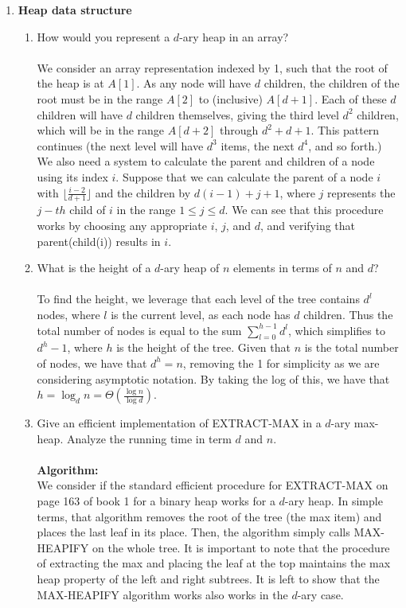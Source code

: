 \documentclass{article}
\begin{document}
\begin{enumerate}
\item \textbf{Heap data structure}
	\begin{enumerate}
		\item How would you represent a $d$-ary heap in an array?
\\\\ We consider an array representation indexed by 1, such that the root of the heap is at $A[1]$. As any node will have $d$ children, the children of the root must be in the range $A[2]$ to (inclusive) $A[d+1]$. Each of these $d$ children will have $d$ children themselves, giving the third level $d^2$ children, which will be in the range $A[d+2]$ through $d^2+d+1$. This pattern continues (the next level will have $d^3$ items, the next $d^4$, and so forth.)
\\ We also need a system to calculate the parent and children of a node using its index $i$. Suppose that we can calculate the parent of a node $i$ with $\lfloor  \frac{i-2}{d+1} \rfloor$ and the children by $d(i-1)+j+1$, where $j$ represents the $j-th$ child of $i$ in the range $1\leq j \leq d$. We can see that this procedure works by choosing any appropriate $i$, $j$, and $d$, and verifying that parent(child(i)) results in $i$.
		\item What is the height of a $d$-ary heap of $n$ elements in terms of $n$ and $d$?
\\\\ To find the height, we leverage that each level of the tree contains $d^l$ nodes, where $l$ is the current level, as each node has $d$ children. Thus the total number of nodes is equal to the sum $\sum_{l=0}^{h-1}d^l$, which simplifies to $d^h-1$, where $h$ is the height of the tree. Given that $n$ is the total number of nodes, we have that $d^h=n$, removing the 1 for simplicity as we are considering asymptotic notation. By taking the log of this, we have that $h=\log_dn= \Theta(\frac{\log n}{\log d})$.
		\item Give an efficient implementation of EXTRACT-MAX in a $d$-ary max-heap. Analyze the running time in term $d$ and $n$.
\\\\ \textbf{Algorithm:} 
\\ We consider if the standard efficient procedure for EXTRACT-MAX on page 163 of book 1 for a binary heap works for a $d$-ary heap. In simple terms, that algorithm removes the root of the tree (the max item) and places the last leaf in its place. Then, the algorithm simply calls MAX-HEAPIFY on the whole tree. It is important to note that the procedure of extracting the max and placing the leaf at the top maintains the max heap property of the left and right subtrees. It is left to show that the MAX-HEAPIFY algorithm works also works in the $d$-ary case.

\end{enumerate}
\end{enumerate}
\end{document}
